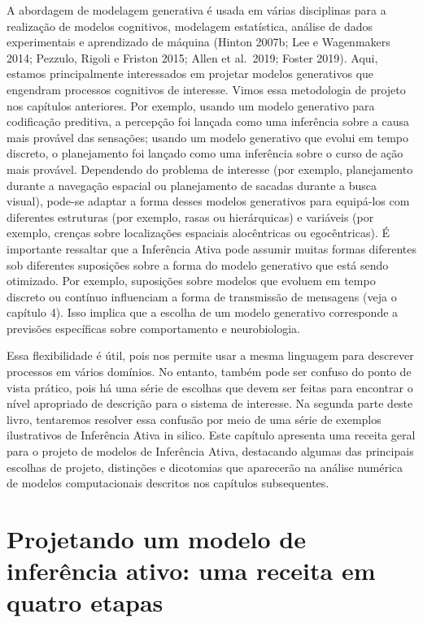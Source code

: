 \documentclass[
  12pt,
]{book}
\begin{document}
A abordagem de modelagem generativa é usada em várias disciplinas para a realização de modelos cognitivos, modelagem estatística, análise de dados experimentais e aprendizado de máquina (Hinton 2007b; Lee e Wagenmakers 2014; Pezzulo, Rigoli e Friston 2015; Allen et al.~2019; Foster 2019). Aqui, estamos principalmente interessados \hspace{0pt}\hspace{0pt}em projetar modelos generativos que engendram processos cognitivos de interesse. Vimos essa metodologia de projeto nos capítulos anteriores. Por exemplo, usando um modelo generativo para codificação preditiva, a percepção foi lançada como uma inferência sobre a causa mais provável das sensações; usando um modelo generativo que evolui em tempo discreto, o planejamento foi lançado como uma inferência sobre o curso de ação mais provável. Dependendo do problema de interesse (por exemplo, planejamento durante a navegação espacial ou planejamento de sacadas durante a busca visual), pode-se adaptar a forma desses modelos generativos para equipá-los com diferentes estruturas (por exemplo, rasas ou hierárquicas) e variáveis \hspace{0pt}\hspace{0pt}(por exemplo, crenças sobre localizações espaciais alocêntricas ou egocêntricas). É importante ressaltar que a Inferência Ativa pode assumir muitas formas diferentes sob diferentes suposições sobre a forma do modelo generativo que está sendo otimizado. Por exemplo, suposições sobre modelos que evoluem em tempo discreto ou contínuo influenciam a forma de transmissão de mensagens (veja o capítulo 4). Isso implica que a escolha de um modelo generativo corresponde a previsões específicas sobre comportamento e neurobiologia.

Essa flexibilidade é útil, pois nos permite usar a mesma linguagem para descrever processos em vários domínios. No entanto, também pode ser confuso do ponto de vista prático, pois há uma série de escolhas que devem ser feitas para encontrar o nível apropriado de descrição para o sistema de interesse. Na segunda parte deste livro, tentaremos resolver essa confusão por meio de uma série de exemplos ilustrativos de Inferência Ativa in silico. Este capítulo apresenta uma receita geral para o projeto de modelos de Inferência Ativa, destacando algumas das principais escolhas de projeto, distinções e dicotomias que aparecerão na análise numérica de modelos computacionais descritos nos capítulos subsequentes.

\hypertarget{projetando-um-modelo-de-inferuxeancia-ativo-uma-receita-em-quatro-etapas}{%
\section{Projetando um modelo de inferência ativo: uma receita em quatro etapas}\label{projetando-um-modelo-de-inferuxeancia-ativo-uma-receita-em-quatro-etapas}}
\end{document}
